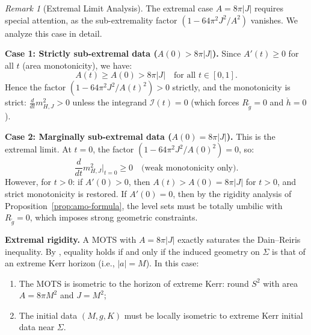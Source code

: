 \documentclass[12pt]{article}
\theoremstyle{plain}
\theoremstyle{definition}
\theoremstyle{remark}
\newtheorem{remark}[theorem]{Remark}
\newcommand{\tg}{\tilde{g}}
\begin{document}
\begin{remark}[Extremal Limit Analysis]\label{rem:extremal-limit}
The extremal case $A = 8\pi|J|$ requires special attention, as the sub-extremality factor $(1 - 64\pi^2 J^2/A^2)$ vanishes. We analyze this case in detail.

\textbf{Case 1: Strictly sub-extremal data ($A(0) > 8\pi|J|$).}
Since $A'(t) \geq 0$ for all $t$ (area monotonicity), we have:
\[
A(t) \geq A(0) > 8\pi|J| \quad \text{for all } t \in [0,1].
\]
Hence the factor $(1 - 64\pi^2 J^2/A(t)^2) > 0$ strictly, and the monotonicity is strict: $\frac{d}{dt}m_{H,J}^2 > 0$ unless the integrand $\mathcal{I}(t) = 0$ (which forces $R_{\tg} = 0$ and $\mathring{h} = 0$).

\textbf{Case 2: Marginally sub-extremal data ($A(0) = 8\pi|J|$).}
This is the extremal limit. At $t = 0$, the factor $(1 - 64\pi^2 J^2/A(0)^2) = 0$, so:
\[
\frac{d}{dt}m_{H,J}^2\Big|_{t=0} \geq 0 \quad \text{(weak monotonicity only)}.
\]
However, for $t > 0$: if $A'(0) > 0$, then $A(t) > A(0) = 8\pi|J|$ for $t > 0$, and strict monotonicity is restored. If $A'(0) = 0$, then by the rigidity analysis of Proposition~\ref{prop:amo-formula}, the level sets must be totally umbilic with $R_{\tg} = 0$, which imposes strong geometric constraints.

\textbf{Extremal rigidity.} A MOTS with $A = 8\pi|J|$ exactly saturates the Dain--Reiris inequality. By \cite[Theorem 1.2]{dain2011}, equality holds if and only if the induced geometry on $\Sigma$ is that of an extreme Kerr horizon (i.e., $|a| = M$). In this case:
\begin{enumerate}
    \item The MOTS is isometric to the horizon of extreme Kerr: round $S^2$ with area $A = 8\pi M^2$ and $J = M^2$;
    \item The initial data $(M, g, K)$ must be locally isometric to extreme Kerr initial data near $\Sigma$.
\end{enumerate}


\end{remark}
\end{document}
